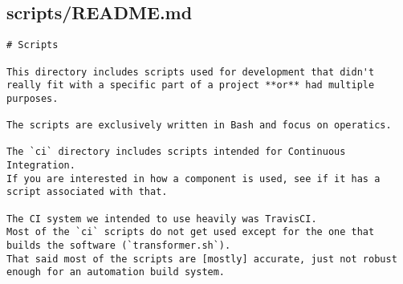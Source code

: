 \subsection{scripts/README.md}
\begin{lstlisting}
# Scripts

This directory includes scripts used for development that didn't really fit with a specific part of a project **or** had multiple purposes.

The scripts are exclusively written in Bash and focus on operatics.

The `ci` directory includes scripts intended for Continuous Integration.
If you are interested in how a component is used, see if it has a script associated with that.

The CI system we intended to use heavily was TravisCI.
Most of the `ci` scripts do not get used except for the one that builds the software (`transformer.sh`).
That said most of the scripts are [mostly] accurate, just not robust enough for an automation build system.
\end{lstlisting}
